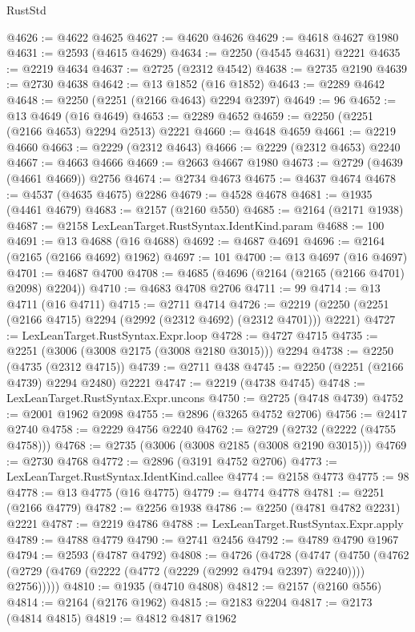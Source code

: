 \begin{lexlean}{RustStd}
\begin{coremodule}
{\begin{coremodule}
{{{{{{{{{{{{{{{{{{{{{{{{{{{{{{{{{{{{{{{{{{{{{{{{{{{{{@4626 := @4622 @4625
@4627 := @4620 @4626
@4629 := @4618 @4627 @1980
@4631 := @2593 (@4615 @4629)
@4634 := @2250 (@4545 @4631) @2221
@4635 := @2219 @4634
@4637 := @2725 (@2312 @4542)
@4638 := @2735 @2190
@4639 := @2730 @4638
@4642 := @13 @1852 (@16 @1852)
@4643 := @2289 @4642
@4648 := @2250 (@2251 (@2166 @4643) @2294 @2397)
@4649 := 96
@4652 := @13 @4649 (@16 @4649)
@4653 := @2289 @4652
@4659 := @2250 (@2251 (@2166 @4653) @2294 @2513) @2221
@4660 := @4648 @4659
@4661 := @2219 @4660
@4663 := @2229 (@2312 @4643)
@4666 := @2229 (@2312 @4653) @2240
@4667 := @4663 @4666
@4669 := @2663 @4667 @1980
@4673 := @2729 (@4639 (@4661 @4669)) @2756
@4674 := @2734 @4673
@4675 := @4637 @4674
@4678 := @4537 (@4635 @4675) @2286
@4679 := @4528 @4678
@4681 := @1935 (@4461 @4679)
@4683 := @2157 (@2160 @550)
@4685 := @2164 (@2171 @1938)
@4687 := @2158 LexLeanTarget.RustSyntax.IdentKind.param
@4688 := 100
@4691 := @13 @4688 (@16 @4688)
@4692 := @4687 @4691
@4696 := @2164 (@2165 (@2166 @4692) @1962)
@4697 := 101
@4700 := @13 @4697 (@16 @4697)
@4701 := @4687 @4700
@4708 := @4685 (@4696 (@2164 (@2165 (@2166 @4701) @2098) @2204))
@4710 := @4683 @4708 @2706
@4711 := 99
@4714 := @13 @4711 (@16 @4711)
@4715 := @2711 @4714
@4726 := @2219 (@2250 (@2251 (@2166 @4715) @2294 (@2992 (@2312 @4692) (@2312 @4701))) @2221)
@4727 := LexLeanTarget.RustSyntax.Expr.loop
@4728 := @4727 @4715
@4735 := @2251 (@3006 (@3008 @2175 (@3008 @2180 @3015))) @2294
@4738 := @2250 (@4735 (@2312 @4715))
@4739 := @2711 @438
@4745 := @2250 (@2251 (@2166 @4739) @2294 @2480) @2221
@4747 := @2219 (@4738 @4745)
@4748 := LexLeanTarget.RustSyntax.Expr.uncons
@4750 := @2725 (@4748 @4739)
@4752 := @2001 @1962 @2098
@4755 := @2896 (@3265 @4752 @2706)
@4756 := @2417 @2740
@4758 := @2229 @4756 @2240
@4762 := @2729 (@2732 (@2222 (@4755 @4758)))
@4768 := @2735 (@3006 (@3008 @2185 (@3008 @2190 @3015)))
@4769 := @2730 @4768
@4772 := @2896 (@3191 @4752 @2706)
@4773 := LexLeanTarget.RustSyntax.IdentKind.callee
@4774 := @2158 @4773
@4775 := 98
@4778 := @13 @4775 (@16 @4775)
@4779 := @4774 @4778
@4781 := @2251 (@2166 @4779)
@4782 := @2256 @1938
@4786 := @2250 (@4781 @4782 @2231) @2221
@4787 := @2219 @4786
@4788 := LexLeanTarget.RustSyntax.Expr.apply
@4789 := @4788 @4779
@4790 := @2741 @2456
@4792 := @4789 @4790 @1967
@4794 := @2593 (@4787 @4792)
@4808 := @4726
    (@4728
      (@4747
        (@4750 (@4762 (@2729 (@4769 (@2222 (@4772 (@2229 (@2992 @4794 @2397) @2240)))) @2756)))))
@4810 := @1935 (@4710 @4808)
@4812 := @2157 (@2160 @556)
@4814 := @2164 (@2176 @1962)
@4815 := @2183 @2204
@4817 := @2173 (@4814 @4815)
@4819 := @4812 @4817 @1962
}}}}}}}}}}}}}}}}}}}}}}}}}}}}}}}}}}}}}}}}}}}}}}}}}}}}}
\end{coremodule}}
\end{coremodule}
\end{lexlean}

